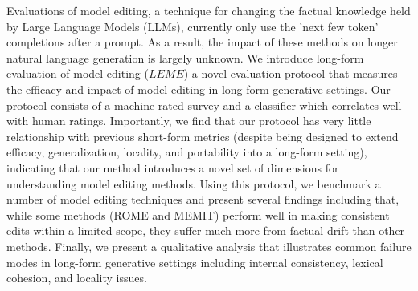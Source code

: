 Evaluations of model editing, a technique for changing the factual knowledge held by Large Language Models (LLMs), currently only use the 'next few token' completions after a prompt. As a result, the impact of these methods on longer natural language generation is largely unknown.  We introduce long-form evaluation of model editing (${\textit{LEME}}$) a novel evaluation protocol that measures the efficacy and impact of model editing in long-form generative settings. Our protocol consists of a machine-rated survey and a classifier which correlates well with human ratings. Importantly, we find that our protocol has very little relationship with previous short-form metrics (despite being designed to extend efficacy, generalization, locality, and portability into a long-form setting), indicating that our method introduces a novel set of dimensions for understanding model editing methods. Using this protocol, we benchmark a number of model editing techniques and present several findings including that, while some methods (ROME and MEMIT) perform well in making consistent edits within a limited scope, they suffer much more from factual drift than other methods. Finally, we present a qualitative analysis that illustrates common failure modes in long-form generative settings including internal consistency, lexical cohesion, and locality issues.